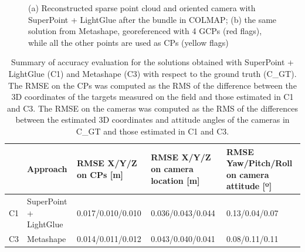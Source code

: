 \begin{figure}
  \centering
  \caption{(a) Reconstructed sparse point cloud and oriented camera with SuperPoint + LightGlue after the bundle in COLMAP; (b) the same solution from Metashape, georeferenced with 4 GCPs (red flags), while all the other points are used as CPs (yellow flags)}
  \label{fig:5:castle_rec}
\end{figure}

\begin{table}
    \centering
    \caption{Summary of accuracy evaluation for the solutions obtained with SuperPoint + LightGlue (C1) and Metashape (C3) with respect to the ground truth (C\_GT). The RMSE on the CPs was computed as the RMS of the difference between the 3D coordinates of the targets measured on the field and those estimated in C1 and C3. The RMSE on the cameras was computed as the RMS of the differences between the estimated 3D coordinates and attitude angles of the cameras in C\_GT and those estimated in C1 and C3.} 
    \label{tab:5:castle_eo_stats}

    \begin{tabular}{l p{2cm} p{3.5cm} p{3.5cm} p{3.5cm}} 
    \toprule
    & Approach & RMSE X/Y/Z \newline on CPs [m] & RMSE X/Y/Z \newline on camera location [m] & RMSE Yaw/Pitch/Roll \newline on camera attitude [º] \\ 
     \midrule
    C1 & SuperPoint + LightGlue & 0.017/0.010/0.010 & 0.036/0.043/0.044 & 0.13/0.04/0.07 \\
    C3 & Metashape & 0.014/0.011/0.012 & 0.043/0.040/0.041 & 0.08/0.11/0.11 \\   
    \bottomrule
    \end{tabular}
\end{table}



